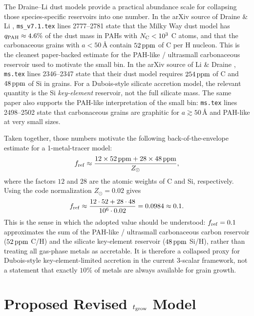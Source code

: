 \documentclass[11pt]{article}
\begin{document}
The Draine--Li dust models provide a practical abundance scale for collapsing those species-specific reservoirs into one number. In the arXiv source of Draine \& Li \cite{DraineLi2007}, \texttt{ms\_v7.1.tex} lines 2777--2781 state that the Milky Way dust model has $q_{\rm PAH}\approx4.6\%$ of the dust mass in PAHs with $N_{\rm C}<10^3$ C atoms, and that the carbonaceous grains with $a<50\,\text{\AA}$ contain $52\,{\rm ppm}$ of C per H nucleon. This is the cleanest paper-backed estimate for the PAH-like / ultrasmall carbonaceous reservoir used to motivate the small bin. In the arXiv source of Li \& Draine \cite{LiDraine2001}, \texttt{ms.tex} lines 2346--2347 state that their dust model requires $254\,{\rm ppm}$ of C and $48\,{\rm ppm}$ of Si in grains. For a Dubois-style silicate accretion model, the relevant quantity is the Si \emph{key-element} reservoir, not the full silicate mass. The same paper also supports the PAH-like interpretation of the small bin: \texttt{ms.tex} lines 2498--2502 state that carbonaceous grains are graphitic for $a\gtrsim50\,\text{\AA}$ and PAH-like at very small sizes.

Taken together, those numbers motivate the following back-of-the-envelope estimate for a 1-metal-tracer model:
\begin{equation}
f_{\rm ref}\approx
\frac{12\times52\,{\rm ppm}+28\times48\,{\rm ppm}}{Z_\odot},
\label{eq:fref_motivation}
\end{equation}
where the factors $12$ and $28$ are the atomic weights of C and Si, respectively. Using the code normalization $Z_\odot=0.02$ gives
\begin{equation}
f_{\rm ref}\approx
\frac{12\cdot52+28\cdot48}{10^6\cdot0.02}
=0.0984\approx0.1.
\label{eq:fref_numeric}
\end{equation}
This is the sense in which the adopted value should be understood: $f_{\rm ref}=0.1$ approximates the sum of the PAH-like / ultrasmall carbonaceous carbon reservoir ($52\,{\rm ppm}$ C/H) and the silicate key-element reservoir ($48\,{\rm ppm}$ Si/H), rather than treating all gas-phase metals as accretable. It is therefore a collapsed proxy for Dubois-style key-element-limited accretion in the current 3-scalar framework, not a statement that exactly $10\%$ of metals are always available for grain growth.

\section{Proposed Revised \texorpdfstring{$t_{\rm grow}$}{t grow} Model}
\end{document}
